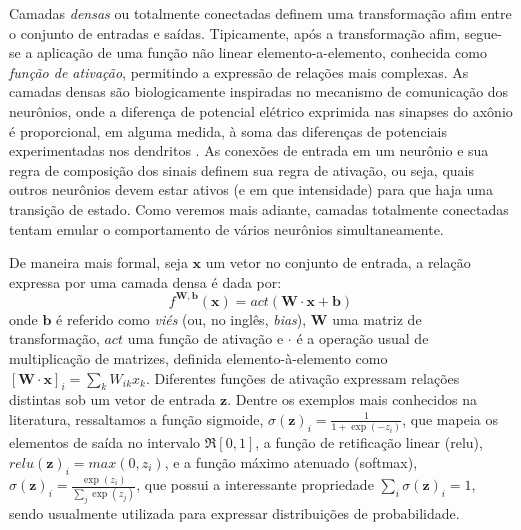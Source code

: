 Camadas \textit{densas} ou totalmente conectadas definem uma transformação afim entre o conjunto de entradas e saídas. Tipicamente, após a transformação afim, segue-se a aplicação de uma função não linear elemento-a-elemento, conhecida como \textit{função de ativação}, permitindo a expressão de relações mais complexas. As camadas densas são biologicamente inspiradas no mecanismo de comunicação dos neurônios, onde a diferença de potencial elétrico exprimida nas sinapses do axônio é proporcional, em alguma medida, à soma das diferenças de potenciais experimentadas nos dendritos \cite{GerstnerNeuronalDynamics}. As conexões de entrada em um neurônio e sua regra de composição dos sinais definem sua regra de ativação, ou seja, quais outros neurônios devem estar ativos (e em que intensidade) para que haja uma transição de estado. Como veremos mais adiante, camadas totalmente conectadas tentam emular o comportamento de vários neurônios simultaneamente.

De maneira mais formal, seja $\mathbf{x}$ um vetor no conjunto de entrada, a relação expressa por uma camada densa é dada por:
\begin{equation}\label{denseop}
f^{\mathbf{W},\mathbf{b}}(\mathbf{x}) = act(\mathbf{W} \cdot \mathbf{x} + \mathbf{b})
\end{equation}
onde $\mathbf{b}$ é referido como \textit{viés} (ou, no inglês, \textit{bias}), $\mathbf{W}$ uma matriz de transformação, $act$ uma função de ativação e $\cdot$ é a operação usual de multiplicação de matrizes, definida elemento-à-elemento como $[\mathbf{W} \cdot \mathbf{x}]_{i} = \sum_k W_{ik} x_k$. Diferentes funções de ativação expressam relações distintas sob um vetor de entrada $\mathbf{z}$. Dentre os exemplos mais conhecidos na literatura, ressaltamos a função sigmoide, $\sigma(\mathbf{z})_i = \frac{1}{1+\exp(-z_i)}$, que mapeia os elementos de saída no intervalo $\Re[0,1]$, a função de retificação linear (relu), $relu(\mathbf{z})_i = max(0, z_i)$, e a função máximo atenuado (softmax), $\sigma(\mathbf{z})_i = \frac{\exp(z_i)}{\sum_j \exp(z_j)}$, que possui a interessante propriedade $\sum_i \sigma(\mathbf{z})_i = 1$, sendo usualmente utilizada para expressar distribuições de probabilidade.

